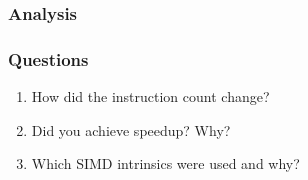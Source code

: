\subsubsection{Analysis}


\subsubsection{Questions}

\begin{enumerate}
    \item How did the instruction count change?
    \item Did you achieve speedup? Why?
    \item Which SIMD intrinsics were used and why?
\end{enumerate}

